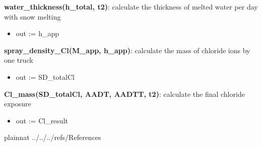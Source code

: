 \documentclass[12pt, titlepage]{article}
\begin{document}
\noindent \textbf{water\_thickness(h\_total, t2)}: calculate the thickness of melted water per day with snow melting
\begin{itemize}
\item out := h\_app
\end{itemize}

\noindent \textbf{spray\_density\_Cl(M\_app, h\_app)}: calculate the mass of chloride ions by one truck
\begin{itemize}
\item out := SD\_totalCl
\end{itemize}

\noindent \textbf{Cl\_mass(SD\_totalCl, AADT, AADTT, t2)}: calculate the final chloride exposure
\begin{itemize}
\item out := Cl\_result
\end{itemize}


 

 {plainnat}
 {../../../refs/References}

\newpage
\end{document}
